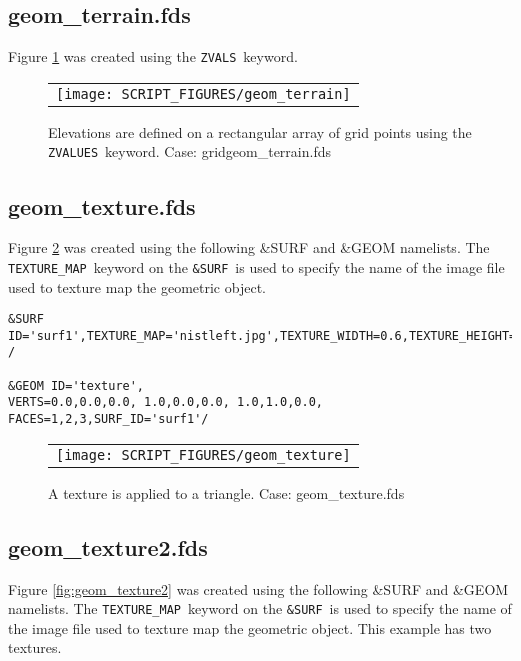 \documentclass[12pt]{article}
\begin{document}
\subsection{geom\_terrain.fds}
Figure \ref{fig:geom_terrain} was created using the {\tt ZVALS}\ keyword.

\begin{figure}[\figoptions]
\begin{center}
\begin{tabular}{c}
 \texttt{[image: SCRIPT\_FIGURES/geom\_terrain]}
  \end{tabular}
\end{center}
 \caption{Elevations are defined on a rectangular array of grid points using the {\tt ZVALUES}\ keyword.  Case: gridgeom\_terrain.fds}
\label{fig:geom_terrain}
\end{figure}

\subsection{geom\_texture.fds}
Figure \ref{fig:geom_texture} was created using the following \&SURF and \&GEOM namelists.
The {\tt TEXTURE\_MAP}\ keyword on the {\tt \&SURF}\ is used to specify the name of the image
file used to texture map the geometric object.

{\scriptsize
\begin{verbatim}
&SURF ID='surf1',TEXTURE_MAP='nistleft.jpg',TEXTURE_WIDTH=0.6,TEXTURE_HEIGHT=0.2,COLOR='BLUE' /

&GEOM ID='texture',
VERTS=0.0,0.0,0.0, 1.0,0.0,0.0, 1.0,1.0,0.0,
FACES=1,2,3,SURF_ID='surf1'/
\end{verbatim}
}

\begin{figure}[\figoptions]
\begin{center}
\begin{tabular}{c}
 \texttt{[image: SCRIPT\_FIGURES/geom\_texture]}
  \end{tabular}
\end{center}
 \caption{A texture is applied to a triangle. Case: geom\_texture.fds}
\label{fig:geom_texture}
\end{figure}

\subsection{geom\_texture2.fds}
Figure \ref{fig:geom_texture2} was created using the following \&SURF and \&GEOM namelists.
The {\tt TEXTURE\_MAP}\ keyword on the {\tt \&SURF}\ is used to specify the name of the image
file used to texture map the geometric object. This example has two textures.
\end{document}
